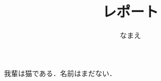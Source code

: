 \documentclass[a4paper]{ltjsarticle}
\title{レポート}
\author{なまえ}
\begin{document}
\maketitle
我輩は猫である．名前はまだない．
\end{document}
